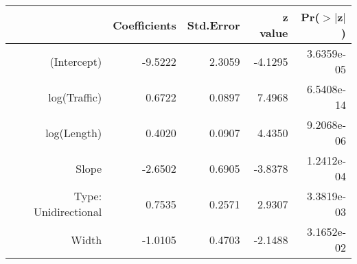 \begin{table}[ht]
\centering
\begin{tabular}{rrrrr}
  \hline
 & Coefficients & Std.Error & z value & Pr($>$$|$z$|$) \\ 
  \hline
(Intercept) & -9.5222 & 2.3059 & -4.1295 & 3.6359e-05 \\ 
  log(Traffic) & 0.6722 & 0.0897 & 7.4968 & 6.5408e-14 \\ 
  log(Length) & 0.4020 & 0.0907 & 4.4350 & 9.2068e-06 \\ 
  Slope & -2.6502 & 0.6905 & -3.8378 & 1.2412e-04 \\ 
  Type: Unidirectional & 0.7535 & 0.2571 & 2.9307 & 3.3819e-03 \\ 
  Width & -1.0105 & 0.4703 & -2.1488 & 3.1652e-02 \\ 
   \hline
\end{tabular}
\end{table}
